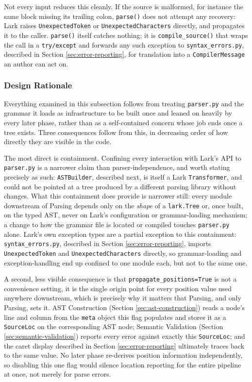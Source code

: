 Not every input reduces this cleanly. If the source is malformed, for instance the same block missing its trailing colon, \lstinline|parse()| does not attempt any recovery: Lark raises \lstinline|UnexpectedToken| or \lstinline|UnexpectedCharacters| directly, and propagates it to the caller. \lstinline|parse()| itself catches nothing; it is \lstinline|compile_source()| that wraps the call in a \lstinline|try/except| and forwards any such exception to \lstinline|syntax_errors.py|, described in Section \ref{sec:error-reporting}, for translation into a \lstinline|CompilerMessage| an author can act on.

\subsubsection{Design Rationale}
Everything examined in this subsection follows from treating \lstinline|parser.py| and the grammar it loads as infrastructure to be built once and leaned on heavily by every later phase, rather than as a self-contained concern whose job ends once a tree exists. Three consequences follow from this, in decreasing order of how directly they are visible in the code.

The most direct is containment. Confining every interaction with Lark's API to \lstinline|parser.py| is a narrower claim than parser-independence, and worth stating precisely as such: \lstinline|ASTBuilder|, described next, is itself a Lark \lstinline|Transformer|, and could not be pointed at a tree produced by a different parsing library without changes. What this containment does provide is narrower still: every module downstream of Parsing depends only on the \emph{shape} of a \lstinline|lark.Tree| or, once built, on the typed AST, never on Lark's configuration or grammar-loading mechanism; a change to how the grammar file is located or compiled touches \lstinline|parser.py| alone. Lark's own exception types are a partial exception to this containment: \lstinline|syntax_errors.py|, described in Section \ref{sec:error-reporting}, imports \lstinline|UnexpectedToken| and \lstinline|UnexpectedCharacters| directly, so grammar-loading and exception-handling end up confined to one module each, but not to the same one.

A second, less visible consequence is that \lstinline|propagate_positions=True| is not a convenience setting, it is the single origin point for every position value used anywhere downstream, which is precisely why it matters that Parsing, and only Parsing, sets it. AST Construction (Section \ref{sec:ast-construction}) reads a node's line and column from the \lstinline|meta| object this flag populates and stores it as a \lstinline|SourceLoc| on the corresponding AST node; Semantic Validation (Section \ref{sec:semantic-validation}) reports every error against exactly this \lstinline|SourceLoc|; and the caret display described in Section \ref{sec:error-reporting} ultimately traces back to the same value. No later phase re-derives position information independently, so disabling this one flag would silence location reporting for the entire pipeline at once, not merely for parse errors.

